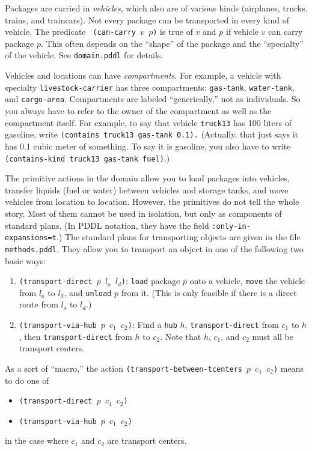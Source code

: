 \documentclass{article}
\begin{document}
Packages are carried in {\em vehicles}, which also are of various
kinds (airplanes, trucks. trains, and traincars).  Not every package
can be transported in every kind of vehicle.  The predicate {\tt
(can-carry $v$ $p$)} is true of $v$ and $p$ if vehicle $v$ can carry
package $p$.  This often depends on the ``shape'' of the package and
the ``specialty'' of the vehicle.  See {\tt domain.pddl} for details.

Vehicles and locations can have {\em compartments}.  For example, a
vehicle with specialty {\tt livestock-carrier} has three compartments:
{\tt gas-tank}, {\tt water-tank}, and {\tt cargo-area}.  Compartments
are labeled ``generically,'' not as individuals.  So you always have to
refer to the owner of the compartment as well as the compartment
itself.  For example, to say that vehicle {\tt truck13} has 100
liters of gasoline, write {\tt (contains truck13 gas-tank 0.1).}
(Actually, that just says it has 0.1 cubic meter of something.   To say it
is gasoline, you also have to write {\tt (contains-kind truck13
gas-tank fuel)}.)

The primitive actions in the domain allow you to load packages into
vehicles, transfer liquids (fuel or water) between vehicles and
storage tanks, and move vehicles from location to location.   However,
the primitives do not tell the whole story.  Most of them cannot be
used in isolation, but only as components of standard plans.  (In PDDL
notation, they have the field {\tt :only-in-expansions=t}.)  The
standard plans for transporting  objects are given in the file {\tt
methods.pddl}.  They allow you to transport an object in one of the
following two basic ways:
\begin{enumerate}
\item {\tt (transport-direct $p$ $l_o$ $l_d$)}: {\tt load} package $p$ onto a
vehicle, {\tt move} the vehicle from $l_o$ to $l_d$, and {\tt unload} $p$ from
it.  (This is only feasible if there is a direct route from $l_o$ to
$l_d$.)

\item {\tt (transport-via-hub $p$ $c_1$ $c_2$)}: Find a {\tt hub} $h$,
{\tt transport-direct} from $c_1$ to $h$, then {\tt transport-direct}
from $h$ to $c_2$.  Note that $h$, $c_1$, and $c_2$ must all be
transport centers.  
\end{enumerate}

As a sort of ``macro,'' the action {\tt (transport-between-tcenters
$p$ $c_1$ $c_2$)} means to do one of 
\begin{itemize}
\item {\tt (transport-direct $p$ $c_1$ $c_2$)}

\item {\tt (transport-via-hub $p$ $c_1$ $c_2$)}
\end{itemize}
in the case where $c_1$ and $c_2$ are transport centers.
\end{document}
